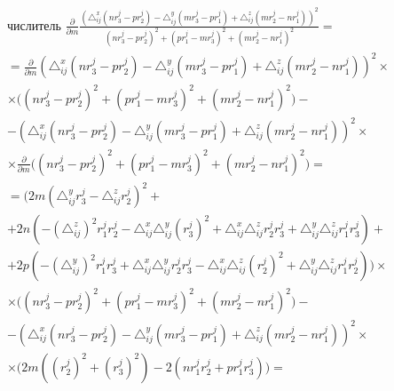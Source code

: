 $$\begin{gathered}
	\text{числитель } \frac{\partial}{\partial m} \frac{\left(\triangle_{ij}^x (n r_3^j - p r_2^j) - \triangle_{ij}^y (m r_3^j - p r_1^j) + \triangle_{ij}^z (m r_2^j - n r_1^j)\right)^2}{(n r_3^j - p r_2^j)^2 + (p r_1^j - m r_3^j)^2 + (m r_2^j - n r_1^j)^2} = \\
	= \frac{\partial}{\partial m} \left(\triangle_{ij}^x (n r_3^j - p r_2^j) - \triangle_{ij}^y (m r_3^j - p r_1^j) + \triangle_{ij}^z (m r_2^j - n r_1^j)\right)^2 \times \\
	\times \bigg( (n r_3^j - p r_2^j)^2 + (p r_1^j - m r_3^j)^2 + (m r_2^j - n r_1^j)^2 \bigg) - \\
	- \left(\triangle_{ij}^x (n r_3^j - p r_2^j) - \triangle_{ij}^y (m r_3^j - p r_1^j) + \triangle_{ij}^z (m r_2^j - n r_1^j)\right)^2 \times \\
	\times \frac{\partial}{\partial m} \bigg( (n r_3^j - p r_2^j)^2 + (p r_1^j - m r_3^j)^2 + (m r_2^j - n r_1^j)^2 \bigg) = \\
	= \bigg( 2 m \left( \triangle_{ij}^y r_3^j - \triangle_{ij}^z r_2^j \right)^2 + \\
	+ 2 n \left( - \left( \triangle_{ij}^z \right)^2 r_1^j r_2^j - \triangle_{ij}^x \triangle_{ij}^y (r_3^j)^2 + \triangle_{ij}^x  \triangle_{ij}^z r_2^j r_3^j + \triangle_{ij}^y  \triangle_{ij}^z r_1^j r_3^j \right) + \\
	+ 2 p \left( - \left( \triangle_{ij}^y\right)^2 r_1^j r_3^j +  \triangle_{ij}^x \triangle_{ij}^y r_2^j r_3^j -  \triangle_{ij}^x  \triangle_{ij}^z (r_2^j)^2 +  \triangle_{ij}^y  \triangle_{ij}^z r_1^j r_2^j \right)  \bigg) \times \\
	\times \bigg( (n r_3^j - p r_2^j)^2 + (p r_1^j - m r_3^j)^2 + (m r_2^j - n r_1^j)^2 \bigg) - \\
	- \left(\triangle_{ij}^x (n r_3^j - p r_2^j) - \triangle_{ij}^y (m r_3^j - p r_1^j) + \triangle_{ij}^z (m r_2^j - n r_1^j)\right)^2 \times \\
	\times \bigg( 2 m \left((r_2^j)^2 + (r_3^j)^2\right) - 2 (n r_1^j r_2^j + p r_1^j r_3^j) \bigg) = 
\end{gathered}$$
\hfill \break \hfill \break \hfill \break \hfill \break \hfill \break \hfill \break \hfill \break \hfill \break \hfill \break \hfill \break \hfill \break \hfill \break \hfill \break \hfill \break \hfill \break \hfill \break \hfill \break \hfill \break \hfill \break
